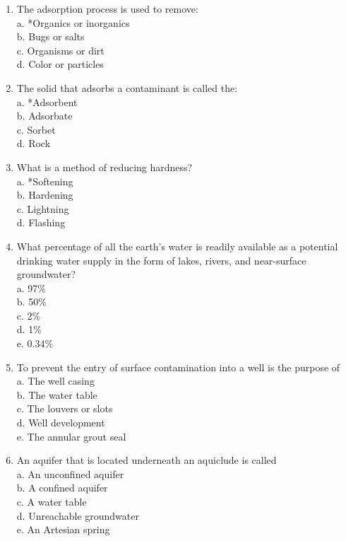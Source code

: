\documentclass[10pt]{article}
\begin{document}
\begin{enumerate}
\item The adsorption process is used to remove:\\
a.  *Organics or inorganics\\
b.  Bugs or salts\\
c.  Organisms or dirt\\
d.  Color or particles\\

\item The solid that adsorbs a contaminant is called the:\\
a.  *Adsorbent\\
b.  Adsorbate\\
c.  Sorbet\\
d.  Rock\\

\item What is a method of reducing hardness?\\
a.  *Softening\\
b.  Hardening\\
c.  Lightning\\
d.  Flashing\\


\item What percentage of all the earth's water is readily available as a potential drinking water supply in the form of lakes, rivers, and near-surface groundwater?\\
a.  97\%\\
b.  50\%\\
c.  2\%\\
d.  1\%\\
e.  0.34\%\\

\item To  prevent the entry of surface contamination into a well is the purpose of\\
a.  The well casing\\
b.  The water table\\
c.  The louvers or slots\\
d.  Well development\\
e.  The  annular grout seal\\

\item An aquifer that is located underneath an aquiclude is called\\
a.  An unconfined aquifer\\
b.  A confined aquifer\\
c.  A water table\\
d.  Unreachable groundwater\\
e.  An Artesian spring\\


\end{enumerate}
\end{document}

